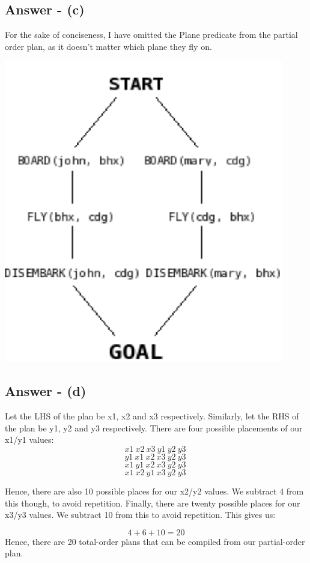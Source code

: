 \documentclass{article}
\begin{document}
\subsection{Answer - (c)}
For the sake of conciseness, I have omitted the Plane predicate from the partial order plan, as it doesn't matter which plane they fly on.
\begin{center}
\includegraphics{IntroToAIE2PartialPlan.png}
\end{center}
\subsection{Answer - (d)}
Let the LHS of the plan be x1, x2 and x3 respectively. Similarly, let the RHS of the plan be y1, y2 and y3 respectively. There are four possible placements of our x1/y1 values: \\

$$ x1\ x2\ x3\ y1\ y2\ y3\ $$
$$ y1\ x1\ x2\ x3\ y2\ y3\ $$
$$ x1\ y1\ x2\ x3\ y2\ y3\ $$
$$ x1\ x2\ y1\ x3\ y2\ y3\ $$

Hence, there are also 10 possible places for our x2/y2 values. We subtract 4 from this though, to avoid repetition. Finally, there are twenty possible places for our x3/y3 values. We subtract 10 from this to avoid repetition. This gives us:

$$4 + 6 + 10 = 20$$
Hence, there are 20 total-order plans that can be compiled from our partial-order plan.
\end{document}
